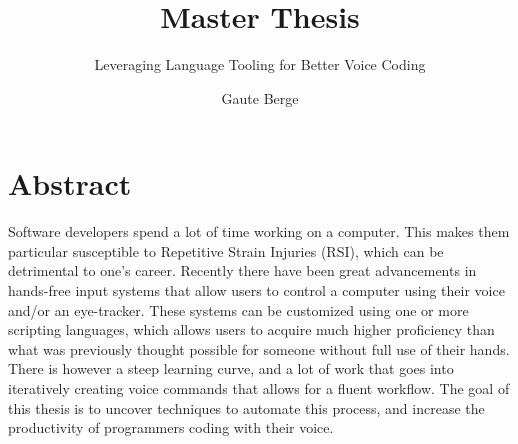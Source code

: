 \documentclass[a4paper,english]{ifimaster}
\title{Master Thesis}
\subtitle{Leveraging Language Tooling for Better Voice Coding}
\author{Gaute Berge}
\begin{document}
\duoforside[dept={Department of Informatics},
program={Informatics: Programming and System Architecture},
long]

\frontmatter{}
\chapter*{Abstract}
Software developers spend a lot of time working on a computer.
This makes them particular susceptible to Repetitive Strain Injuries (RSI), which can be detrimental to one's career.
Recently there have been great advancements in hands-free input systems that allow users to control a computer using their voice and/or an eye-tracker.
These systems can be customized using one or more scripting languages, which allows users to acquire much higher proficiency than what was previously thought possible for someone without full use of their hands.
There is however a steep learning curve, and a lot of work that goes into iteratively creating voice commands that allows for a fluent workflow.
The goal of this thesis is to uncover techniques to automate this process, and increase the productivity of programmers coding with their voice.

\tableofcontents{}
\listoffigures{}
\listoftables{}


\mainmatter{}
\end{document}
